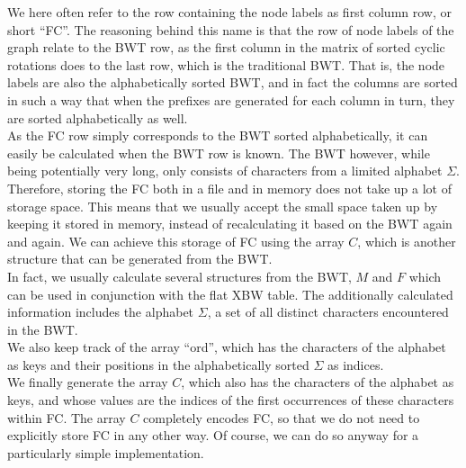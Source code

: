 \documentclass[a4paper,12pt,twoside,BCOR=10mm]{scrbook}
\begin{document}
We here often refer to the row containing the node labels as first column row, or short “FC”.
The reasoning behind this name is that the row of node labels of the graph relate to the BWT row,
as the first column in the matrix of sorted cyclic rotations does to the last row, which is the traditional BWT.
That is, the node labels are also the alphabetically sorted BWT, and in fact the columns are sorted in such a
way that when the prefixes are generated for each column in turn, they are sorted alphabetically as well. \\
As the FC row simply corresponds to the BWT sorted alphabetically, it can easily be calculated
when the BWT row is known. The BWT however, while being potentially very
long, only consists of characters from a limited alphabet $ \Sigma $.
Therefore, storing the FC both in a file and in memory does not take up a lot of storage space.
This means that we usually accept the small space taken up by keeping it stored in memory,
instead of recalculating it based on the BWT again and again.
We can achieve this storage of FC using the array $ C $, which is another structure that can be generated
from the BWT. \\
In fact, we usually calculate several structures from the BWT, $ M $ and $ F $ which
can be used in conjunction with the flat XBW table.
The additionally calculated information includes
the alphabet $ \Sigma $, a set of all distinct characters encountered in the BWT. \\
We also keep track of the array “ord”, which has the characters of the alphabet as keys and their
positions in the alphabetically sorted $ \Sigma $ as indices. \\
We finally generate the array $ C $, which also has the characters of the alphabet as keys,
and whose values are the indices of the first occurrences of these characters within FC.
The array $ C $ completely encodes FC, so that we do not need to explicitly store FC in any other way.
Of course, we can do so anyway for a particularly simple implementation.
\end{document}
